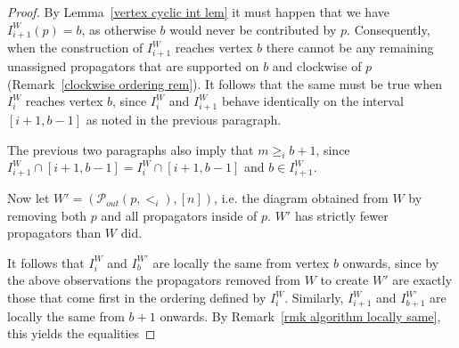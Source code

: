 \documentclass[11pt]{article}
\newcommand{\sanote}{\todo[color=violet!30]}
\newcommand{\cP}{\mathcal{P}}
\theoremstyle{remark}
\theoremstyle{definition}
\begin{document}
\begin{proof}
By Lemma~\ref{vertex cyclic int lem} it must happen that we have $I_{i+1}^W(p) = b$, as otherwise $b$ would never be contributed by $p$.  Consequently, when the construction of $I_{i+1}^W$ reaches vertex $b$ there cannot be any remaining unassigned propagators that are supported on $b$ and clockwise of $p$ (Remark~\ref{clockwise ordering rem}). It follows that the same must be true when $I_i^W$ reaches vertex $b$, since $I_i^W$ and $I_{i+1}^W$ behave identically on the interval $[i+1,b-1]$ as noted in the previous paragraph. 

The previous two paragraphs also imply that $m \geq_i b+1$, since $I_{i+1}^W \cap [i+1,b-1] = I_{i}^W \cap [i+1,b-1]$ and $b \in I_{i+1}^W$.


Now let $W' = (\cP_{out}(p,<_i), [n])$, i.e. the diagram obtained from $W$ by removing both $p$ and all propagators inside of $p$. $W'$ has strictly fewer propagators than $W$ did.

It follows that $I_i^W$ and $I_b^{W'}$ are locally the same from vertex $b$ onwards, since by the above observations the propagators removed from $W$ to create $W'$ are exactly those that come first in the ordering defined by $I_i^W$. Similarly, $I_{i+1}^W$ and $I_{b+1}^{W'}$ are locally the same from $b+1$ onwards. By Remark~\ref{rmk algorithm locally same}, this yields the equalities




\end{proof}
\end{document}

